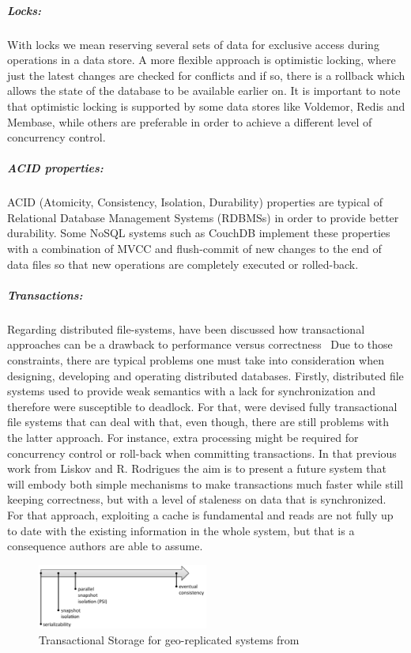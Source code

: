 		\subparagraph{Locks:}
		With locks we mean reserving several sets of data for exclusive access during operations in a data store. A more flexible approach is optimistic locking, where just the latest changes are checked for conflicts and if so, there is a rollback which allows the state of the database to be available earlier on. It is important to note that optimistic locking is supported by some data stores like Voldemor, Redis and Membase, while others are preferable in order to achieve a different level of concurrency control.
		
		\subparagraph{ACID properties:}
		ACID (Atomicity, Consistency, Isolation, Durability) properties are typical of Relational Database Management Systems (RDBMSs) in order to provide better durability. Some NoSQL systems such as CouchDB implement these properties with a combination of MVCC and flush-commit of new changes to the end of data files so that new operations are completely executed or rolled-back.

		\subparagraph{Transactions:}
		Regarding distributed file-systems, have been discussed how transactional approaches can be a drawback to performance versus correctness~\cite{Liskov:2004} Due to those constraints, there are typical problems one must take into consideration when designing, developing and operating distributed databases. Firstly, distributed file systems used to provide weak semantics with a lack for synchronization and therefore were susceptible to deadlock. For that, were devised fully transactional file systems that can deal with that, even though, there are still problems with the latter approach. For instance, extra processing might be required for concurrency control or roll-back when committing transactions. In that previous work from Liskov and R. Rodrigues the aim is to present a future system that will embody both simple mechanisms to make transactions much faster while still keeping correctness, but with a level of staleness on data that is synchronized. For that approach, exploiting a cache is fundamental and reads are not fully up to date with the existing information in the whole system, but that is a consequence authors are able to assume.

\begin{figure}[h]
\centering
\includegraphics[width=0.5\textwidth]{figs/consistency}
\caption{Transactional Storage for geo-replicated systems from \protect\cite{Sovran:2011}}
\end{figure}

